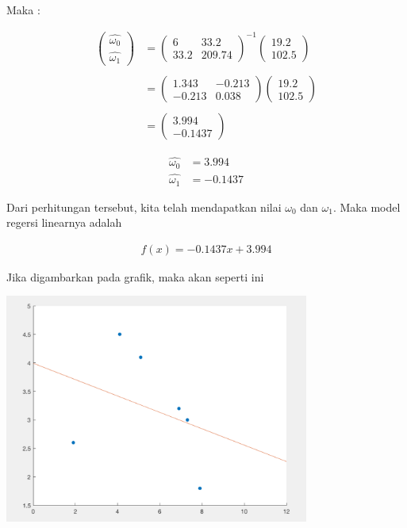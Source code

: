 \documentclass[12pt]{article}%
\begin{document}
\begin{enumerate}
\begin{enumerate}
		\par Maka : 

			\begin{align*}
				\begin{pmatrix} \hat{\omega_0} \\ \hat{\omega_1} \end{pmatrix} & = \begin{pmatrix} 6 & 33.2\\ 33.2 & 209.74\end{pmatrix}^{-1} \begin{pmatrix} 19.2\\ 102.5 \end{pmatrix} \\ \\
				& = \begin{pmatrix} 1.343 & -0.213\\ -0.213 & 0.038 \end{pmatrix} \begin{pmatrix} 19.2\\ 102.5 \end{pmatrix} \\ \\
				& = \begin{pmatrix}3.994 \\ -0.1437 \end{pmatrix}
			\end{align*}

			\begin{align*}
				\hat{\omega_0} & = 3.994 \\ 
				\hat{\omega_1} & = -0.1437
			\end{align*}

		\par Dari perhitungan tersebut, kita telah mendapatkan nilai $\omega_0$ dan $\omega_1$. Maka model regersi linearnya adalah 

			\begin{align*}
				f(x) = -0.1437x + 3.994
			\end{align*} 

		\par Jika digambarkan pada grafik, maka akan seperti ini

		\par \includegraphics[width=10cm]{ass2clo2fig1} 


\end{enumerate}
\end{enumerate}
\end{document}
